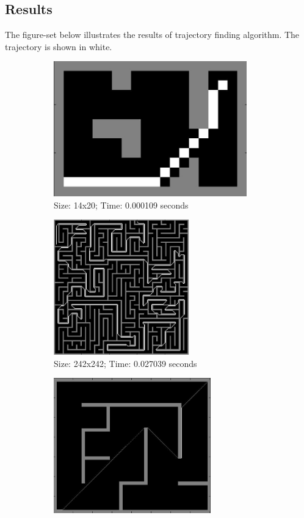 \documentclass[a4paper]{article}
\begin{document}
\subsection*{Results}
The figure-set below illustrates the results of trajectory finding algorithm. The trajectory is shown in white.
\begin{figure}[H]
\centering
	\begin{subfigure}[t]{3in}
		\centering
		\includegraphics[height=2.3in]{wf-simple}
		\caption{Size: 14x20; Time: 0.000109 seconds}\label{fig:wf-a}
	\end{subfigure}
	\quad
	\begin{subfigure}[t]{3in}
		\centering
		\includegraphics[height=2.3in]{wf-maze}
		\caption{Size: 242x242; Time: 0.027039 seconds}\label{fig:wf-b}
	\end{subfigure}
	\quad
	\begin{subfigure}[t]{3in}
		\centering
		\includegraphics[height=2.3in]{wf-mazeBig}

\end{subfigure}
\end{figure}
\end{document}
